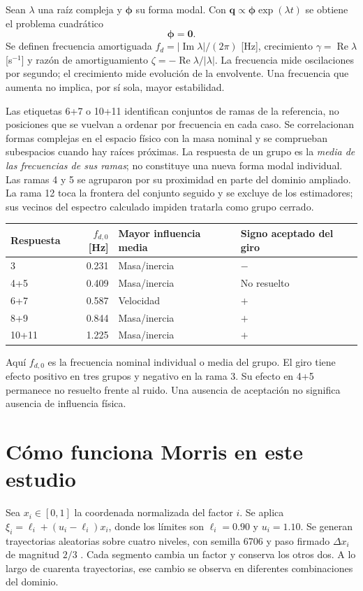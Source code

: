 \documentclass[11pt,a4paper]{article}
\begin{document}
Sean $\lambda$ una raíz compleja y $\boldsymbol\phi$ su forma modal. Con $\boldsymbol q\propto\boldsymbol\phi\exp(\lambda t)$ se obtiene el problema cuadrático
\begin{equation}
[\lambda^2\mathsf M+\lambda\mathsf D+\mathsf K]\boldsymbol\phi=\boldsymbol 0.
\end{equation}
Se definen frecuencia amortiguada $f_d=|\operatorname{Im}\lambda|/(2\pi)$ [Hz], crecimiento $\gamma=\operatorname{Re}\lambda$ [s$^{-1}$] y razón de amortiguamiento $\zeta=-\operatorname{Re}\lambda/|\lambda|$. La frecuencia mide oscilaciones por segundo; el crecimiento mide evolución de la envolvente. Una frecuencia que aumenta no implica, por sí sola, mayor estabilidad.

Las etiquetas 6+7 o 10+11 identifican conjuntos de ramas de la referencia, no posiciones que se vuelvan a ordenar por frecuencia en cada caso. Se correlacionan formas complejas en el espacio físico con la masa nominal y se comprueban subespacios cuando hay raíces próximas. La respuesta de un grupo es la \emph{media de las frecuencias de sus ramas}; no constituye una nueva forma modal individual. Las ramas 4 y 5 se agruparon por su proximidad en parte del dominio ampliado. La rama 12 toca la frontera del conjunto seguido y se excluye de los estimadores; sus vecinos del espectro calculado impiden tratarla como grupo cerrado.

\begin{center}\small
\begin{tabular}{lrlp{3cm}}
\toprule Respuesta & $f_{d,0}$ [Hz] & Mayor influencia media & Signo aceptado del giro \\ \midrule
3 & 0.231 & Masa/inercia & $-$ \\
4+5 & 0.409 & Masa/inercia & No resuelto \\
6+7 & 0.587 & Velocidad & $+$ \\
8+9 & 0.844 & Masa/inercia & $+$ \\
10+11 & 1.225 & Masa/inercia & $+$ \\

\bottomrule
\end{tabular}
\end{center}
Aquí $f_{d,0}$ es la frecuencia nominal individual o media del grupo. El giro tiene efecto positivo en tres grupos y negativo en la rama 3. Su efecto en 4+5 permanece no resuelto frente al ruido. Una ausencia de aceptación no significa ausencia de influencia física.

\section{Cómo funciona Morris en este estudio}
Sea $x_i\in[0,1]$ la coordenada normalizada del factor $i$. Se aplica $\xi_i=\ell_i+(u_i-\ell_i)x_i$, donde los límites son $\ell_i=0.90$ y $u_i=1.10$. Se generan trayectorias aleatorias sobre cuatro niveles, con semilla 6706 y paso firmado $\Delta x_i$ de magnitud $2/3$ \cite{morris1991}. Cada segmento cambia un factor y conserva los otros dos. A lo largo de cuarenta trayectorias, ese cambio se observa en diferentes combinaciones del dominio.
\end{document}
